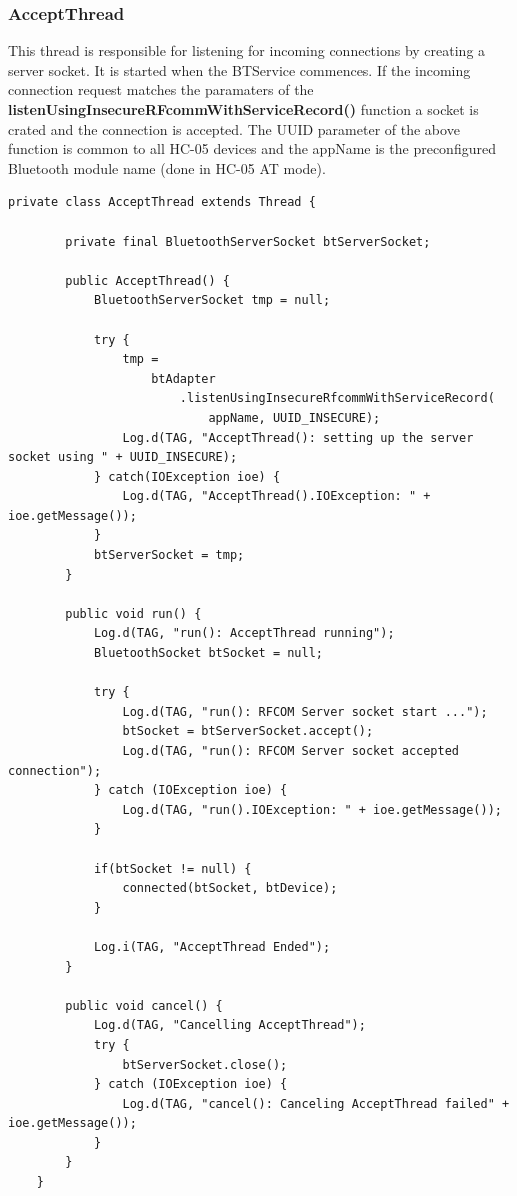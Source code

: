 \documentclass[12pt,a4paper]{article}
\begin{document}
    \subsubsection*{AcceptThread}
    This thread is responsible for listening for incoming connections by creating a server socket. It is started when the BTService commences. If the incoming connection request matches the paramaters of the {\bfseries listenUsingInsecureRFcommWithServiceRecord()} function a socket is crated and the connection is accepted. The UUID parameter of the above function is common to all HC-05 devices and the appName is the preconfigured Bluetooth module name (done in HC-05 AT mode).
    
   \begin{lstlisting}[label={lst:acceptThread}, caption=AcceptThread class]
    private class AcceptThread extends Thread {

        private final BluetoothServerSocket btServerSocket;

        public AcceptThread() {
            BluetoothServerSocket tmp = null;

            try {
                tmp = 
                    btAdapter
                        .listenUsingInsecureRfcommWithServiceRecord(
                            appName, UUID_INSECURE);
                Log.d(TAG, "AcceptThread(): setting up the server socket using " + UUID_INSECURE);
            } catch(IOException ioe) {
                Log.d(TAG, "AcceptThread().IOException: " + ioe.getMessage());
            }
            btServerSocket = tmp;
        }

        public void run() {
            Log.d(TAG, "run(): AcceptThread running");
            BluetoothSocket btSocket = null;

            try {
                Log.d(TAG, "run(): RFCOM Server socket start ...");
                btSocket = btServerSocket.accept();
                Log.d(TAG, "run(): RFCOM Server socket accepted connection");
            } catch (IOException ioe) {
                Log.d(TAG, "run().IOException: " + ioe.getMessage());
            }

            if(btSocket != null) {
                connected(btSocket, btDevice);
            }

            Log.i(TAG, "AcceptThread Ended");
        }

        public void cancel() {
            Log.d(TAG, "Cancelling AcceptThread");
            try {
                btServerSocket.close();
            } catch (IOException ioe) {
                Log.d(TAG, "cancel(): Canceling AcceptThread failed" + ioe.getMessage());
            }
        }
    }
    \end{lstlisting}
    
\end{document}

